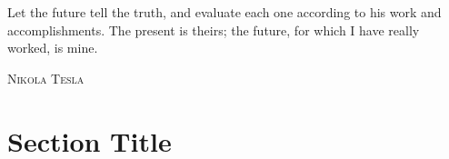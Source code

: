 \epigraph{Let the future tell the truth, and evaluate each one according to his work and accomplishments. The present is theirs; the future, for which I have really worked, is mine.}%
{\textsc{Nikola Tesla}}
\null\vfill
\newpage
\blankpagewithnumber
\section{Section Title}
\lipsum[1]
\newpage
\blankpagewithnumber